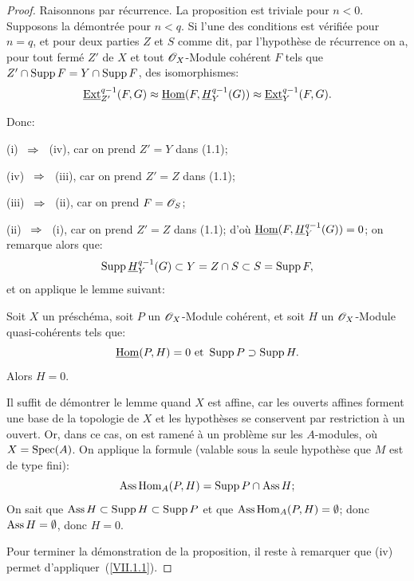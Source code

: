 \begin{proof}
Raisonnons par r\'ecurrence. La proposition est triviale pour $n < 0$. Supposons la d\'emontr\'ee pour $n < q$. Si l'une des conditions est v\'erifi\'ee pour $n = q$, et pour deux parties $Z$ et $S$ comme dit, par l'hypoth\`ese de r\'ecurrence on a, pour tout ferm\'e $Z'$ de $X$ et tout $\mathscr{O}_X$-Module coh\'erent $F$ tels que $Z' \cap \operatorname{Supp} F = Y \cap \operatorname{Supp} F$, des isomorphismes:
\begin{equation}\label{eq:VII.1.1}\mathop{\underline{\mathrm{Ext}}}\nolimits^{q-1}_{Z'} (F, G) \approx \mathop{\underline{\mathrm{Hom}}}\nolimits (F, \underline{H}^{q-1}_Y (G)) \approx \mathop{\underline{\mathrm{Ext}}}\nolimits^{q-1}_Y (F, G).\end{equation}

\noindent Donc:

(i) ~$\To$~ (iv), car on prend $Z' = Y$ dans (1.1);

(iv) ~$\To$~ (iii), car on prend $Z' = Z$ dans (1.1);

(iii) ~$\To$~ (ii), car on prend $F = {\mathscr O}_S$;

(ii) ~$\To$~ (i), car on prend $Z' = Z$ dans (1.1); d'o\`u $\mathop{\underline{\mathrm{Hom}}}\nolimits (F, \underline{H}_Y^{q-1} (G)) = 0$; on remarque alors que:
\[
\operatorname{Supp} \underline{H}_Y^{q-1} (G) \subset Y = Z \cap S \subset S = \operatorname{Supp} F,
\]
et on applique le lemme suivant:

\begin{lemme} \label{VII.1.3}
Soit $X$ un pr\'esch\'ema, soit $P$ un $\mathscr{O}_X$-Module coh\'erent, et soit $H$ un $\mathscr{O}_X$-Module quasi-coh\'erents tels que:
\[
\mathop{\underline{\mathrm{Hom}}}\nolimits (P, H) = 0 \text{ et } \operatorname{Supp} P \supset \operatorname{Supp} H.
\]
Alors $H = 0$.
\end{lemme}

Il suffit de d\'emontrer le lemme quand $X$ est affine, car les ouverts affines forment une base de la topologie de $X$ et les hypoth\`eses se conservent par restriction \`a un ouvert. Or, dans ce cas, on est ramen\'e \`a un probl\`eme sur les $A$-modules, o\`u $X = \operatorname{Spec}(A)$. On applique la formule (valable sous la seule hypoth\`ese que $M$ est de type fini):
\[
\operatorname{Ass} \operatorname{Hom}_A (P, H) = \operatorname{Supp} P \cap \operatorname{Ass} H;\]
On sait que $\operatorname{Ass} H \subset \operatorname{Supp} H \subset \operatorname{Supp} P$ et que $\operatorname{Ass} \operatorname{Hom}_A (P, H) = \emptyset$; donc $\operatorname{Ass} H = \emptyset$, donc $H = 0$.

Pour terminer la d\'emonstration de la proposition, il reste \`a remarquer que (iv) permet d'appliquer~(\ref{VII.1.1}).
\skipqed
\end{proof}

